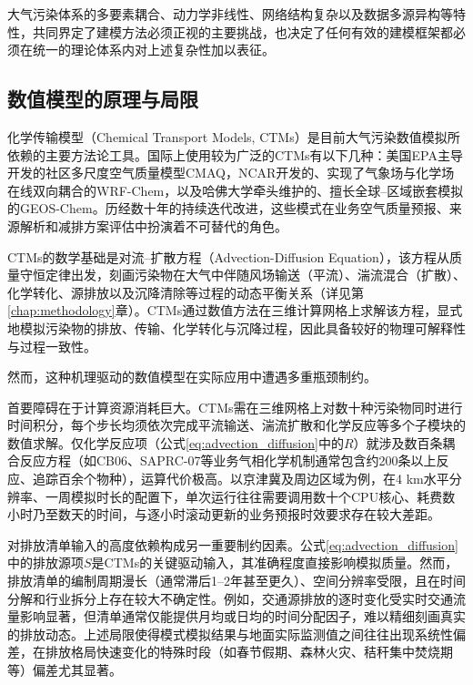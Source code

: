 大气污染体系的多要素耦合、动力学非线性、网络结构复杂以及数据多源异构等特性，共同界定了建模方法必须正视的主要挑战，也决定了任何有效的建模框架都必须在统一的理论体系内对上述复杂性加以表征。

\subsection{数值模型的原理与局限}
\label{subsec:traditional_models}

化学传输模型（Chemical Transport Models, CTMs）是目前大气污染数值模拟所依赖的主要方法论工具。国际上使用较为广泛的CTMs有以下几种：美国EPA主导开发的社区多尺度空气质量模型CMAQ\citep{byun2006review}，NCAR开发的、实现了气象场与化学场在线双向耦合的WRF-Chem\citep{grell2005fully}，以及哈佛大学牵头维护的、擅长全球--区域嵌套模拟的GEOS-Chem\citep{bey2001global}。历经数十年的持续迭代改进，这些模式在业务空气质量预报、来源解析和减排方案评估中扮演着不可替代的角色。

CTMs的数学基础是对流--扩散方程（Advection-Diffusion Equation），该方程从质量守恒定律出发，刻画污染物在大气中伴随风场输送（平流）、湍流混合（扩散）、化学转化、源排放以及沉降清除等过程的动态平衡关系（详见第\ref{chap:methodology}章）。CTMs通过数值方法在三维计算网格上求解该方程，显式地模拟污染物的排放、传输、化学转化与沉降过程，因此具备较好的物理可解释性与过程一致性。

然而，这种机理驱动的数值模型在实际应用中遭遇多重瓶颈制约。

首要障碍在于计算资源消耗巨大。CTMs需在三维网格上对数十种污染物同时进行时间积分，每个步长均须依次完成平流输送、湍流扩散和化学反应等多个子模块的数值求解。仅化学反应项（公式\eqref{eq:advection_diffusion}中的$R$）就涉及数百条耦合反应方程（如CB06、SAPRC-07等业务气相化学机制通常包含约200条以上反应、追踪百余个物种），运算代价极高\citep{appel2021community}。以京津冀及周边区域为例，在4 km水平分辨率、一周模拟时长的配置下，\CMAQ 单次运行往往需要调用数十个CPU核心、耗费数小时乃至数天的时间，与逐小时滚动更新的业务预报时效要求存在较大差距。

对排放清单输入的高度依赖构成另一重要制约因素。公式\eqref{eq:advection_diffusion}中的排放源项$S$是CTMs的关键驱动输入，其准确程度直接影响模拟质量。然而，排放清单的编制周期漫长（通常滞后1--2年甚至更久）、空间分辨率受限，且在时间分解和行业拆分上存在较大不确定性\citep{thongthammachart2021integrated}。例如，交通源排放的逐时变化受实时交通流量影响显著，但清单通常仅能提供月均或日均的时间分配因子\citep{inventory}，难以精细刻画真实的排放动态。上述局限使得模式模拟结果与地面实际监测值之间往往出现系统性偏差，在排放格局快速变化的特殊时段（如春节假期、森林火灾、秸秆集中焚烧期等）偏差尤其显著。

